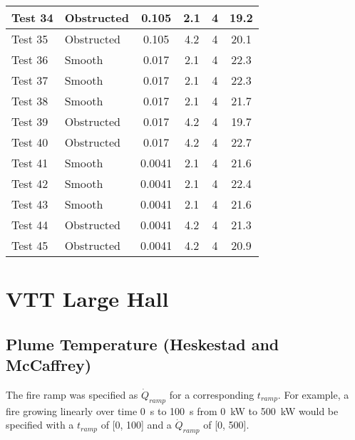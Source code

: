 \begin{table}[!ht]
\begin{center}
\begin {tabular}{|l|l|c|c|c|c|}
Test 34    &  Obstructed    &  0.105            &  2.1        &  4              &  19.2              \\ \hline
Test 35    &  Obstructed    &  0.105            &  4.2        &  4              &  20.1              \\ \hline
Test 36    &  Smooth        &  0.017            &  2.1        &  4              &  22.3              \\ \hline
Test 37    &  Smooth        &  0.017            &  2.1        &  4              &  22.3              \\ \hline
Test 38    &  Smooth        &  0.017            &  2.1        &  4              &  21.7              \\ \hline
Test 39    &  Obstructed    &  0.017            &  4.2        &  4              &  19.7              \\ \hline
Test 40    &  Obstructed    &  0.017            &  4.2        &  4              &  22.7              \\ \hline
Test 41    &  Smooth        &  0.0041           &  2.1        &  4              &  21.6              \\ \hline
Test 42    &  Smooth        &  0.0041           &  2.1        &  4              &  22.4              \\ \hline
Test 43    &  Smooth        &  0.0041           &  2.1        &  4              &  21.6              \\ \hline
Test 44    &  Obstructed    &  0.0041           &  4.2        &  4              &  21.3              \\ \hline
Test 45    &  Obstructed    &  0.0041           &  4.2        &  4              &  20.9              \\ \hline
\end{tabular}
\end{center}
\end{table}


\clearpage


\section{VTT Large Hall}

\subsection*{Plume Temperature (Heskestad and McCaffrey)}

The fire ramp was specified as $\dot Q_{ramp}$ for a corresponding $t_{ramp}$.
For example, a fire growing linearly over time 0~s to 100~s from 0~kW to 500~kW
would be specified with a $t_{ramp}$ of [0, 100] and a $\dot Q_{ramp}$ of [0, 500].


